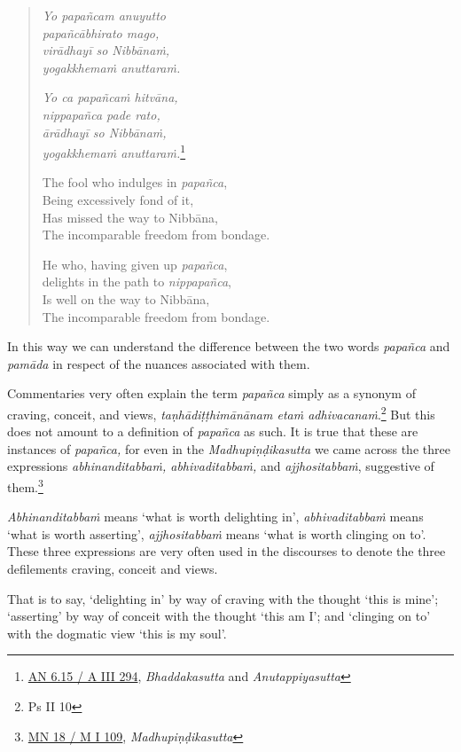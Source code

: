 \begin{quote}
\emph{Yo papañcam anuyutto}\\
\emph{papañcābhirato mago,}\\
\emph{virādhayī so Nibbānaṁ,}\\
\emph{yogakkhemaṁ anuttaraṁ.}

\emph{Yo ca papañcaṁ hitvāna,}\\
\emph{nippapañca pade rato,}\\
\emph{ārādhayī so Nibbānaṁ,}\\
\emph{yogakkhemaṁ anuttaraṁ.}\footnote{\href{https://suttacentral.net/an6.15/pli/ms}{AN 6.15 / A III 294}, \emph{Bhaddakasutta} and \emph{Anutappiyasutta}}

The fool who indulges in \emph{papañca},\\
Being excessively fond of it,\\
Has missed the way to Nibbāna,\\
The incomparable freedom from bondage.

He who, having given up \emph{papañca},\\
delights in the path to \emph{nippapañca},\\
Is well on the way to Nibbāna,\\
The incomparable freedom from bondage.
\end{quote}

In this way we can understand the difference between the two words \emph{papañca} and \emph{pamāda} in respect of the nuances associated with them.

Commentaries very often explain the term \emph{papañca} simply as a synonym of craving, conceit, and views, \emph{taṇhādiṭṭhimānānam etaṁ adhivacanaṁ}.\footnote{Ps II 10} But this does not amount to a definition of \emph{papañca} as such. It is true that these are instances of \emph{papañca,} for even in the \emph{Madhupiṇḍikasutta} we came across the three expressions \emph{abhinanditabbaṁ, abhivaditabbaṁ,} and \emph{ajjhositabbaṁ}, suggestive of them.\footnote{\href{https://suttacentral.net/mn18/pli/ms}{MN 18 / M I 109}, \emph{Madhupiṇḍikasutta}}

\emph{Abhinanditabbaṁ} means `what is worth delighting in', \emph{abhivaditabbaṁ} means `what is worth asserting', \emph{ajjhositabbaṁ} means `what is worth clinging on to'. These three expressions are very often used in the discourses to denote the three defilements craving, conceit and views.

That is to say, `delighting in' by way of craving with the thought `this is mine'; `asserting' by way of conceit with the thought `this am I'; and `clinging on to' with the dogmatic view `this is my soul'.

